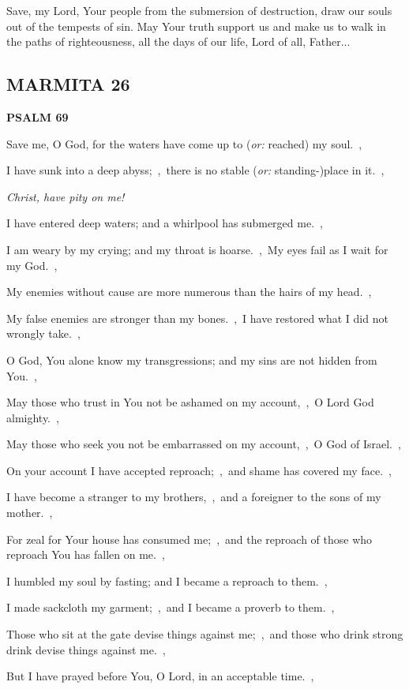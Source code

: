 \documentclass[12pt,twoside,a5paper]{article}
\newcommand{\marmita}[1]{\subsection*{MARMITA {#1}}}
\newcommand{\psalm}[1]{\textbf{PSALM {#1}}\nopagebreak}
\newcommand{\qanona}[1]{{\liturgicalhint{Qanona.} \emph{#1}}}
\newcommand{\slota}[1]{\liturgicalhint{Slota.} #1}
\newcommand{\translationoption}[1]{\emph{or:} #1}
\begin{document}
\slota{Save, my Lord, Your people from the submersion of destruction, draw our souls out of the tempests of sin. May Your truth support us and make us to walk in the paths of righteousness, all the days of our life, Lord of all, Father...}

\marmita{26}

\psalm{69}

\begin{normalparskip}
  Save me, O God, for the waters have come up to (\translationoption{reached}) my soul.~\sep

  I have sunk into a deep abyss;~\sep\ there is no stable (\translationoption{standing-})place in it.~\sep

  \qanona{Christ, have pity on me!}

  I have entered deep waters; and a whirlpool has submerged me.~\sep

  I am weary by my crying; and my throat is hoarse.~\sep\ My eyes fail as I wait for my God.~\sep

  My enemies without cause are more numerous than the hairs of my head.~\sep

  My false enemies are stronger than my bones.~\sep\ I have restored what I did not wrongly take.~\sep

  O God, You alone know my transgressions; and my sins are not hidden from You.~\sep

  May those who trust in You not be ashamed on my account,~\sep\ O Lord God almighty.~\sep

  May those who seek you not be embarrassed on my account,~\sep\ O God of Israel.~\sep

  On your account I have accepted reproach;~\sep\ and shame has covered my face.~\sep

  I have become a stranger to my brothers,~\sep\ and a foreigner to the sons of my mother.~\sep

  For zeal for Your house has consumed me;~\sep\ and the reproach of those who reproach You has fallen on me.~\sep

  I humbled my soul by fasting; and I became a reproach to them.~\sep

  I made sackcloth my garment;~\sep\ and I became a proverb to them.~\sep

  Those who sit at the gate devise things against me;~\sep\ and those who drink strong drink devise things against me.~\sep

  But I have prayed before You, O Lord, in an acceptable time.~\sep


\end{normalparskip}
\end{document}
